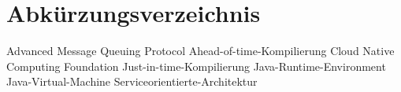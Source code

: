 
\chapter*{Abkürzungsverzeichnis\thispagestyle{empty}} 
\label{chap:acronyms}

\footnotesize
\begin{acronym}[MMMM]
 {Advanced Message Queuing Protocol}
    {Ahead-of-time-Kompilierung}
    {Cloud Native Computing Foundation}
     {Just-in-time-Kompilierung}
    {Java-Runtime-Environment}
        {Java-Virtual-Machine}
      {Serviceorientierte-Architektur}
   

\end{acronym}
\normalsize
